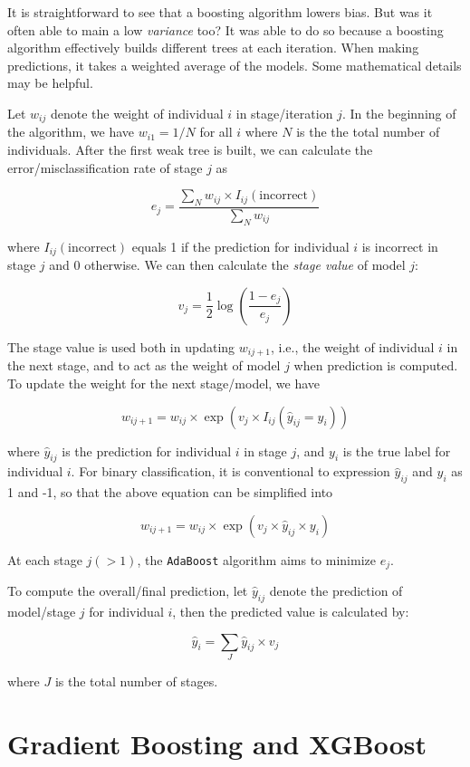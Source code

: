 \documentclass[
]{book}
\theoremstyle{definition}
\theoremstyle{definition}
\theoremstyle{definition}
\theoremstyle{definition}
\theoremstyle{remark}
\begin{document}
It is straightforward to see that a boosting algorithm lowers bias. But was it often able to main a low \emph{variance} too? It was able to do so because a boosting algorithm effectively builds different trees at each iteration. When making predictions, it takes a weighted average of the models. Some mathematical details may be helpful.

Let \(w_{ij}\) denote the weight of individual \(i\) in stage/iteration \(j\). In the beginning of the algorithm, we have \(w_{i1}=1/N\) for all \(i\) where \(N\) is the the total number of individuals. After the first weak tree is built, we can calculate the error/misclassification rate of stage \(j\) as

\[e_j = \frac{\sum_{N}{w_{ij}\times I_{ij}(\text{incorrect})}}{\sum_{N}{w_{ij}}}\]

where \(I_{ij}(\text{incorrect})\) equals 1 if the prediction for individual \(i\) is incorrect in stage \(j\) and 0 otherwise. We can then calculate the \emph{stage value} of model \(j\):

\[v_j = \frac{1}{2}\log\left(\frac{1-e_j}{e_j}\right)\]

The stage value is used both in updating \(w_{ij+1}\), i.e., the weight of individual \(i\) in the next stage, and to act as the weight of model \(j\) when prediction is computed. To update the weight for the next stage/model, we have

\[w_{ij+1} = w_{ij} \times \exp{(v_j \times I_{ij}(\hat{y}_{ij}=y_i))}\]

where \(\hat{y}_{ij}\) is the prediction for individual \(i\) in stage \(j\), and \(y_i\) is the true label for individual \(i\). For binary classification, it is conventional to expression \(\hat{y}_{ij}\) and \(y_i\) as 1 and -1, so that the above equation can be simplified into

\[w_{ij+1} = w_{ij} \times \exp{(v_j \times \hat{y}_{ij}\times y_i)}\]

At each stage \(j(>1)\), the \texttt{AdaBoost} algorithm aims to minimize \(e_j\).

To compute the overall/final prediction, let \(\hat{y}_{ij}\) denote the prediction of model/stage \(j\) for individual \(i\), then the predicted value is calculated by:

\[\hat{y}_{i} = \sum_{J}{\hat{y}_{ij} \times v_j}\]

where \(J\) is the total number of stages.

\hypertarget{gradient-boosting-and-xgboost}{%
\section{Gradient Boosting and XGBoost}\label{gradient-boosting-and-xgboost}}
\end{document}
